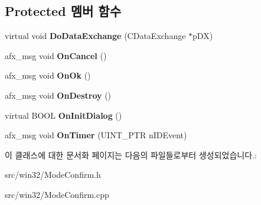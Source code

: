 \subsection*{Protected 멤버 함수}
\begin{DoxyCompactItemize}
\item 
\mbox{\label{class_mode_confirm_a7bdff1de3b87c2d066fabf0fcb4e5211}} 
virtual void {\bfseries Do\+Data\+Exchange} (C\+Data\+Exchange $\ast$p\+DX)
\item 
\mbox{\label{class_mode_confirm_a5933e4703c9d0af9747384a61f994804}} 
afx\+\_\+msg void {\bfseries On\+Cancel} ()
\item 
\mbox{\label{class_mode_confirm_a96cb9297efcd1f637efa870a21561f51}} 
afx\+\_\+msg void {\bfseries On\+Ok} ()
\item 
\mbox{\label{class_mode_confirm_a74d3691e5fe1cbe376f082a431de8c43}} 
afx\+\_\+msg void {\bfseries On\+Destroy} ()
\item 
\mbox{\label{class_mode_confirm_a9ff77c7ebd8b567013ca1ef1dee00b46}} 
virtual B\+O\+OL {\bfseries On\+Init\+Dialog} ()
\item 
\mbox{\label{class_mode_confirm_a403c1ae22f1d3791ed51a452185a64be}} 
afx\+\_\+msg void {\bfseries On\+Timer} (U\+I\+N\+T\+\_\+\+P\+TR n\+I\+D\+Event)
\end{DoxyCompactItemize}


이 클래스에 대한 문서화 페이지는 다음의 파일들로부터 생성되었습니다.\+:\begin{DoxyCompactItemize}
\item 
src/win32/Mode\+Confirm.\+h\item 
src/win32/Mode\+Confirm.\+cpp\end{DoxyCompactItemize}
